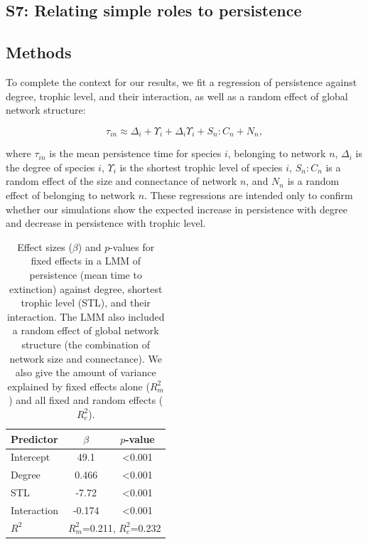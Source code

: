 \documentclass[12pt]{article}
\begin{document}
\begin{spacing}{2.0}
\clearpage


\section*{S7: Relating simple roles to persistence}

	\subsection*{Methods}

            To complete the context for our results, we fit a regression of persistence against degree, trophic level, and their interaction, as well as a random effect of global network structure:
            
            \begin{equation}
                \tau_{in} \approx \Delta_{i} + \Upsilon_{i} + \Delta_{i}\Upsilon_{i} + S_{n}:C_{n} + N_n ,
                \label{eq:persistence_degTL}
            \end{equation}
            
            \noindent where $\tau_{in}$ is the mean persistence time for species $i$, belonging to network $n$, $\Delta_i$ is the degree of species $i$, $\Upsilon_i$ is the shortest trophic level of species $i$, $S_{n}:C_{n}$ is a random effect of the size and connectance of network $n$, and $N_n$ is a random effect of belonging to network $n$.
            These regressions are intended only to confirm whether our simulations show the expected increase in persistence with degree and decrease in persistence with trophic level.


		\begin{table}[hb!]
			\caption{Effect sizes ($\beta$) and $p$-values for fixed effects in a LMM of persistence (mean time to extinction) against degree, shortest trophic level (STL), and their interaction. The LMM also included a random effect of global network structure (the combination of network size and connectance). We also give the amount of variance explained by fixed effects alone ($R^2_m$) and all fixed and random effects ($R^2_c$).}
			\label{tab:per_degTL}
			\begin{tabular}{l | c c }
			Predictor & $\beta$ & $p$-value \\
			\hline
			Intercept & 49.1 & \textless0.001 \\
			Degree & 0.466 & \textless0.001 \\
			STL & -7.72 & \textless0.001 \\
			Interaction & -0.174 & \textless0.001 \\
			\hline
			$R^2$ & \multicolumn{2}{|c}{$R^2_m$=0.211, $R^2_c$=0.232} \\
			\end{tabular}
			\end{table}


\end{spacing}
\end{document}
